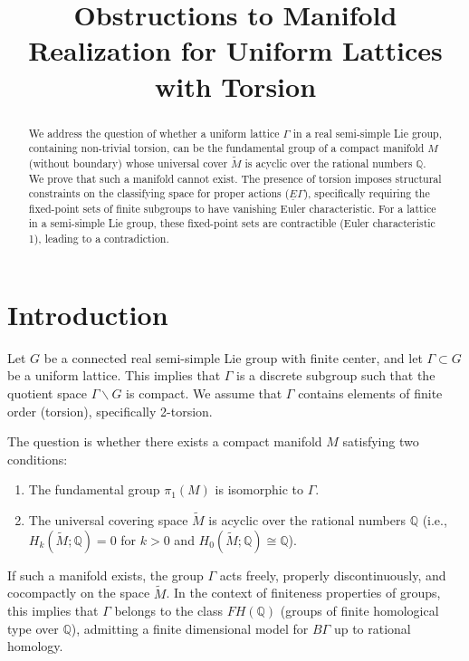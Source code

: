 \documentclass[11pt]{article}
\title{Obstructions to Manifold Realization for Uniform Lattices with Torsion}
\author{}
\date{}
\theoremstyle{plain}
\theoremstyle{definition}
\begin{document}
\maketitle

\begin{abstract}
We address the question of whether a uniform lattice $\Gamma$ in a real semi-simple Lie group, containing non-trivial torsion, can be the fundamental group of a compact manifold $M$ (without boundary) whose universal cover $\tilde{M}$ is acyclic over the rational numbers $\mathbb{Q}$. We prove that such a manifold cannot exist. The presence of torsion imposes structural constraints on the classifying space for proper actions ($\underline{E}\Gamma$), specifically requiring the fixed-point sets of finite subgroups to have vanishing Euler characteristic. For a lattice in a semi-simple Lie group, these fixed-point sets are contractible (Euler characteristic 1), leading to a contradiction.
\end{abstract}

\section{Introduction}

Let $G$ be a connected real semi-simple Lie group with finite center, and let $\Gamma \subset G$ be a uniform lattice. This implies that $\Gamma$ is a discrete subgroup such that the quotient space $\Gamma \backslash G$ is compact. We assume that $\Gamma$ contains elements of finite order (torsion), specifically 2-torsion.

The question is whether there exists a compact manifold $M$ satisfying two conditions:
\begin{enumerate}
    \item The fundamental group $\pi_1(M)$ is isomorphic to $\Gamma$.
    \item The universal covering space $\tilde{M}$ is acyclic over the rational numbers $\mathbb{Q}$ (i.e., $H_k(\tilde{M}; \mathbb{Q}) = 0$ for $k > 0$ and $H_0(\tilde{M}; \mathbb{Q}) \cong \mathbb{Q}$).
\end{enumerate}

If such a manifold exists, the group $\Gamma$ acts freely, properly discontinuously, and cocompactly on the space $\tilde{M}$. In the context of finiteness properties of groups, this implies that $\Gamma$ belongs to the class $FH(\mathbb{Q})$ (groups of finite homological type over $\mathbb{Q}$), admitting a finite dimensional model for $B\Gamma$ up to rational homology.
\end{document}
